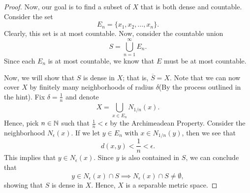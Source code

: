 \documentclass[a4paper]{article}
\begin{document}
\begin{proof}
   Now, our goal is to find a subset of \( X  \) that is both dense and countable. Consider the set
   \[  {E}_{n} = \{ {x}_{1}, {x}_{2}, \dots, {x}_{n} \}. \]
   Clearly, this set is at most countable. Now, consider the countable union
   \[  S = \bigcup_{ n=1  }^{ \infty   }  {E}_{n}. \]
   Since each \( {E}_{n} \) is at most countable, we know that \( E  \) must be at most countable.

   Now, we will show that \( S  \) is dense in \( X  \); that is, \( \overline{S} = X  \). Note that we can now cover \( X  \) by finitely many neighborhoods of radius \( \delta \)(By the process outlined in the hint). Fix \( \delta = \frac{ 1 }{ n }  \) and denote 
   \[  X = \bigcup_{ x \in {E}_{n} }^{  }  {N}_{1/n}(x). \]
   Hence, pick \( n \in \mathbb{N}  \) such that \( \frac{ 1 }{ n }  < \epsilon  \) by the Archimeadean Property. Consider the neighborhood \( {N}_{\epsilon}(x)  \). If we let \( y \in {E}_{n} \) with \( x \in {N}_{1/n}(y) \), then we see that  
   \[  d(x,y) < \frac{ 1 }{ n }  < \epsilon. \]
   This implies that \( y \in {N}_{\epsilon}(x) \). Since \( y  \) is also contained in \( S  \), we can conclude that
   \[  y \in {N}_{\epsilon}(x) \cap S \implies {N}_{\epsilon}(x) \cap S \neq \emptyset, \]
   showing that \( S  \) is dense in \( X  \). Hence, \( X  \) is a separable metric space.
   \end{proof}
\end{document}
